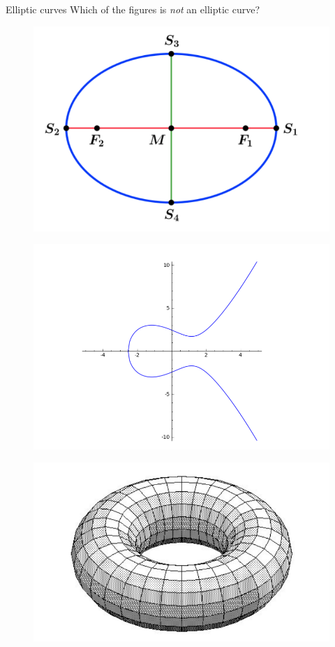 \documentclass{beamer}
\begin{document}
\begin{frame}{Elliptic curves}
	Which of the figures is \textit{not} an elliptic curve?
	\begin{figure}
		\begin{minipage}{0.48\textwidth}
			\centering
			\includegraphics[width=.7\linewidth]{ellipse}
			\label{fig:ellipse}
		\end{minipage}\hfill
		\begin{minipage}{0.48\textwidth}
			\centering
			\includegraphics[width=.7\linewidth]{elliptic_curve}
			\label{fig:elliptic_curve}
		\end{minipage}
	\end{figure}
	\begin{figure}
	\begin{minipage}{0.48\textwidth}
		\centering
		\includegraphics[width=.7\linewidth]{elliptic_curve_c}

\end{minipage}
\end{figure}
\end{frame}
\end{document}
